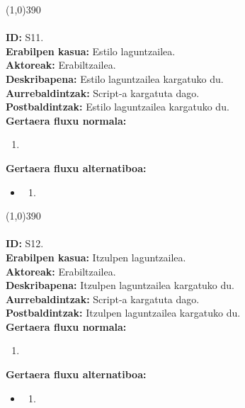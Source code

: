 \line(1,0){390}\\
\noindent\\
\textbf{ID:} S11.\\
\textbf{Erabilpen kasua:} Estilo laguntzailea.\\
\textbf{Aktoreak:} Erabiltzailea.\\
\textbf{Deskribapena:} Estilo laguntzailea kargatuko du.\\
\textbf{Aurrebaldintzak:} Script-a kargatuta dago.\\
\textbf{Postbaldintzak:} Estilo laguntzailea kargatuko du.\\
\textbf{Gertaera fluxu normala:}
\begin{enumerate}
	\item
\end{enumerate}
\textbf{Gertaera fluxu alternatiboa:}
\begin{itemize}
	\item 
		\begin{enumerate}
		\item
		\end{enumerate}
\end{itemize}
\line(1,0){390}\\
\noindent\\
\textbf{ID:} S12.\\
\textbf{Erabilpen kasua:} Itzulpen laguntzailea.\\
\textbf{Aktoreak:} Erabiltzailea.\\
\textbf{Deskribapena:} Itzulpen laguntzailea kargatuko du.\\
\textbf{Aurrebaldintzak:} Script-a kargatuta dago.\\
\textbf{Postbaldintzak:} Itzulpen laguntzailea kargatuko du.\\
\textbf{Gertaera fluxu normala:}
\begin{enumerate}
	\item
\end{enumerate}
\textbf{Gertaera fluxu alternatiboa:}
\begin{itemize}
	\item 
		\begin{enumerate}
		\item
		\end{enumerate}
\end{itemize}
\newpage


